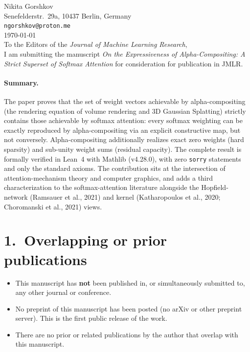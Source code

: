 \documentclass[11pt]{article}
\begin{document}
\thispagestyle{empty}

\noindent Nikita Gorshkov\\
Senefelderstr.\ 29a, 10437 Berlin, Germany\\
\texttt{ngorshkov@proton.me}\\[1em]
\noindent\today\\[1em]

\noindent To the Editors of the \emph{Journal of Machine Learning Research},\\

I am submitting the manuscript \emph{On the Expressiveness of Alpha-Compositing:
A Strict Superset of Softmax Attention} for consideration for publication in JMLR.

\paragraph{Summary.}
The paper proves that the set of weight vectors achievable by alpha-compositing
(the rendering equation of volume rendering and 3D Gaussian Splatting) strictly
contains those achievable by softmax attention: every softmax weighting can be
exactly reproduced by alpha-compositing via an explicit constructive map, but not
conversely. Alpha-compositing additionally realizes exact zero weights (hard
sparsity) and sub-unity weight sums (residual capacity). The complete result is
formally verified in Lean~4 with Mathlib (v4.28.0), with zero \texttt{sorry}
statements and only the standard axioms. The contribution sits at the
intersection of attention-mechanism theory and computer graphics, and adds a
third characterization to the softmax-attention literature alongside the
Hopfield-network (Ramsauer et al., 2021) and kernel (Katharopoulos et al., 2020;
Choromanski et al., 2021) views.

\section*{1.~Overlapping or prior publications}
\begin{itemize}[leftmargin=1.4em]
  \item This manuscript has \textbf{not} been published in, or simultaneously
    submitted to, any other journal or conference.
  \item No preprint of this manuscript has been posted (no arXiv or other
    preprint server). This is the first public release of the work.
  \item There are no prior or related publications by the author that overlap
    with this manuscript.
\end{itemize}
\end{document}
